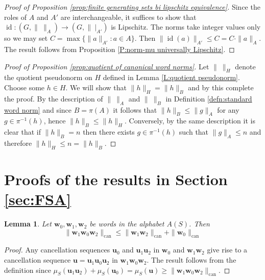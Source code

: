 \documentclass[12pt]{amsart}
\newtheorem{lemma}[prop]{Lemma}
\theoremstyle{definition}
\newcommand{\B}[1]{\mathbf{#1}}
\newcommand{\OP}[1]{\operatorname{#1}}
\def\can{\text{can}}
\begin{document}
\begin{proof}[Proof of Proposition \ref{prop:finite generating sets bi lipschitz equivalence}]
Since the roles of $A$ and $A'$ are interchangeable, it suffices to show that $\OP{id} \colon (G,\|\ \|_A) \to (G,\| \ |_{A'})$ is  Lipschitz.
The norms take integer values only so we may set $C= \max \{ \| a\|_{A'} : a \in A\}$.
Then $\|\OP{id}(a)\|_{A'} \leq C = C \cdot \|a\|_A$.
The result follows from Proposition \ref{P:norm-mu universally Lipschitz}.
\end{proof}






\begin{proof}[Proof of Proposition \ref{prop:quotient of canonical word norms}]
Let $\| \ \|_H$ denote the quotient pseudonorm on $H$ defined in Lemma \ref{L:quotient pseudonorm}.
Choose some $h \in H$.
We will show that $\| h \|_H=\| h\|_B$ and by this complete the proof.
By the description of $\| \ \|_A$ and $\| \ \|_B$ in Definition \ref{defn:standard word norm} and since $B=\pi(A)$ it follows that $\|h\|_B \leq \|g\|_A$ for any $g \in \pi^{-1}(h)$, hence $\|h\|_B \leq \|h\|_H$.
Conversely, by the same description it is clear that if $\|h\|_B=n$ then there exists $g \in \pi^{-1}(h)$ such that $\| g\|_A \leq n$ and therefore $\|h\|_H \leq n = \|h\|_B$.
\end{proof}






\section{Proofs of the results in Section \ref{sec:FSA}}\label{app:proof of FSA}



\begin{lemma}\label{lem:can WAS triangle}
Let $\B w_0, \B w_1, \B w_2$ be words in the alphabet $A(S)$.
Then
\[
\| \B w_1 \B w_0 \B w_2\|_{\can} \leq \| \B w_1 \B w_2\|_{\can} + \| \B w_0\|_{\can}
\]
\end{lemma}

\begin{proof} %
Any cancellation sequences $\B u_0$ and $\B u_1 \B u_2$ in $\B w_0$ and $\B w_1 \B w_2$ give rise to a cancellation sequence $\B u = \B u_1 \B u_0 \B u_2$ in $\B w_1 \B w_0 \B w_2$.
The result follows from the definition since $\mu_S(\B u_1\B u_2) + \mu_S(\B u_0)= \mu_S(\B u) \geq \| \B w_1 \B w_0 \B w_2 \|_{\can}$.
\end{proof}
\end{document}
